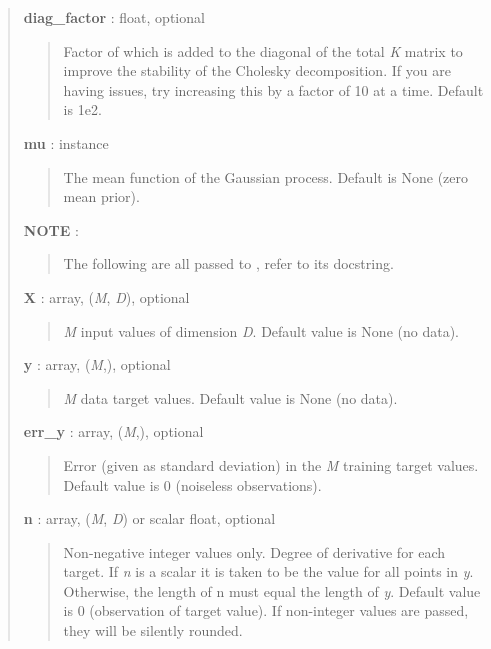 \documentclass[letterpaper,10pt,english]{sphinxmanual}
\begin{document}
\begin{fulllineitems}
\begin{quote}
\begin{description}
\textbf{diag\_factor} : float, optional
\begin{quote}

Factor of  which is added to the
diagonal of the total \emph{K} matrix to improve the stability of the
Cholesky decomposition. If you are having issues, try increasing this by
a factor of 10 at a time. Default is 1e2.
\end{quote}

\textbf{mu} : {\hyperref[gptools:gptools.mean.MeanFunction]{}} instance
\begin{quote}

The mean function of the Gaussian process. Default is None (zero mean
prior).
\end{quote}

\textbf{NOTE} :
\begin{quote}

The following are all passed to {\hyperref[gptools:gptools.gaussian_process.GaussianProcess.add_data]{}}, refer to its
docstring.
\end{quote}

\textbf{X} : array, (\emph{M}, \emph{D}), optional
\begin{quote}

\emph{M} input values of dimension \emph{D}. Default value is None (no data).
\end{quote}

\textbf{y} : array, (\emph{M},), optional
\begin{quote}

\emph{M} data target values. Default value is None (no data).
\end{quote}

\textbf{err\_y} : array, (\emph{M},), optional
\begin{quote}

Error (given as standard deviation) in the \emph{M} training target values.
Default value is 0 (noiseless observations).
\end{quote}

\textbf{n} : array, (\emph{M}, \emph{D}) or scalar float, optional
\begin{quote}

Non-negative integer values only. Degree of derivative for each target.
If \emph{n} is a scalar it is taken to be the value for all points in \emph{y}.
Otherwise, the length of n must equal the length of \emph{y}. Default value
is 0 (observation of target value). If non-integer values are passed,
they will be silently rounded.
\end{quote}


\end{description}
\end{quote}
\end{fulllineitems}
\end{document}
